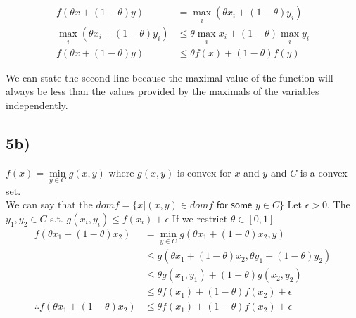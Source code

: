 \documentclass[12pt,letter]{article}
\begin{document}
\begin{align*}
    f(\theta x + (1-\theta)y) &= \max\limits_i{(\theta x_i + (1-\theta)y_i)}\\
    \max\limits_i{(\theta x_i + (1-\theta)y_i)} &\leq \theta\max\limits_ix_i + (1-\theta)\max\limits_iy_i \\
    f(\theta x + (1-\theta)y) &\leq \theta f(x) + (1-\theta)f(y) 
\end{align*}

We can state the second line because the maximal value of the function will always
be less than the values provided by the maximals of the variables independently.

\subsection*{5b)}
$f(x) = \min\limits_{y\in C}g(x,y)$ where $g(x,y)$ is convex for $x$ and $y$ and $C$
is a convex set.
\\
We can say that the $dom f = \{x | (x,y) \in dom f \textsf{ for some } y\in C\}$
Let $\epsilon > 0$. The $y_1,y_2\in C$ s.t. $g(x_i,y_i) \leq f(x_i)+\epsilon$
If we restrict $\theta\in[0,1]$
\begin{align*}
    f(\theta x_1 + (1-\theta)x_2) &= \min\limits_{y\in C}g(\theta x_1+(1-\theta)x_2,y) \\
    &\leq g(\theta x_1 + (1-\theta)x_2,\theta y_1 + (1-\theta)y_2) \\
    &\leq \theta g(x_1,y_1) + (1-\theta)g(x_2,y_2) \\
    &\leq \theta f(x_1) + (1-\theta)f(x_2) + \epsilon \\
    \therefore f(\theta x_1 + (1-\theta)x_2) &\leq \theta f(x_1) + (1-\theta)f(x_2) + \epsilon
\end{align*}
\end{document}
